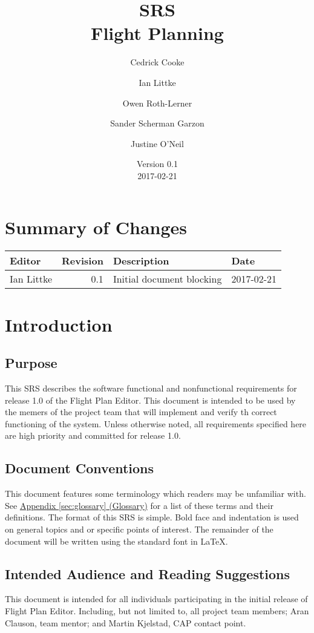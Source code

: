 \documentclass[12pt, letterpaper]{article}
\title{SRS \\
Flight Planning
}
\author{ Cedrick Cooke
    \and Ian Littke
    \and Owen Roth-Lerner
    \and Sander Scherman Garzon
    \and Justine O'Neil
}
\date{Version 0.1 \\ 2017-02-21}
\begin{document}
\maketitle

\tableofcontents
\raggedright
\section*{Summary of Changes}
\begin{tabularx}{\textwidth}{|l|r|X|l|}
\hline
Editor & Revision & Description & Date \\ \hline \hline
Ian Littke & 0.1 & Initial document blocking & 2017-02-21 \\ \hline
\end{tabularx}

\section{Introduction}
  \subsection{Purpose}
    This SRS describes the software functional and nonfunctional requirements
    for release 1.0 of the Flight Plan Editor.
    This document is intended to be used by the memers of the project team that will implement
    and verify th correct functioning of the system.
    Unless otherwise noted, all requirements specified here are high priority
    and committed for release 1.0.
  \subsection{Document Conventions}
  This document features some terminology which readers may be unfamiliar with.
  See \hyperref[sec:glossary]{Appendix \ref{sec:glossary} (Glossary)} for a list of these terms and their definitions.
  The format of this SRS is simple. Bold face and indentation is used on general topics and or specific points of interest.
  The remainder of the document will be written using the standard font in \LaTeX.
  \subsection{Intended Audience and Reading Suggestions}
  This document is intended for all individuals participating in the initial release of Flight Plan Editor.
  Including, but not limited to, all project team members; Aran Clauson, team mentor; and Martin Kjelstad, CAP contact point.
\end{document}
